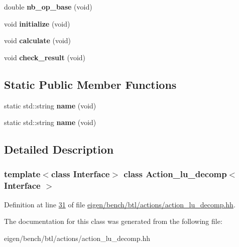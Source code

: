 \begin{DoxyCompactItemize}
\item 
\mbox{\label{class_action__lu__decomp_a381d0374009d61ad08fbb5999b2fc707}} 
double {\bfseries nb\+\_\+op\+\_\+base} (void)
\item 
\mbox{\label{class_action__lu__decomp_a065c46760336805cac70deaccfd02509}} 
void {\bfseries initialize} (void)
\item 
\mbox{\label{class_action__lu__decomp_a5169d51b797f4e14aa889ffe131e6725}} 
void {\bfseries calculate} (void)
\item 
\mbox{\label{class_action__lu__decomp_aad26b74edbf61c61acefd2d9060284a3}} 
void {\bfseries check\+\_\+result} (void)
\end{DoxyCompactItemize}
\subsection*{Static Public Member Functions}
\begin{DoxyCompactItemize}
\item 
\mbox{\label{class_action__lu__decomp_a5568b3c3145f94cdb995492960dbb63c}} 
static std\+::string {\bfseries name} (void)
\item 
\mbox{\label{class_action__lu__decomp_a5568b3c3145f94cdb995492960dbb63c}} 
static std\+::string {\bfseries name} (void)
\end{DoxyCompactItemize}


\subsection{Detailed Description}
\subsubsection*{template$<$class Interface$>$\newline
class Action\+\_\+lu\+\_\+decomp$<$ Interface $>$}



Definition at line \hyperlink{eigen_2bench_2btl_2actions_2action__lu__decomp_8hh_source_l00031}{31} of file \hyperlink{eigen_2bench_2btl_2actions_2action__lu__decomp_8hh_source}{eigen/bench/btl/actions/action\+\_\+lu\+\_\+decomp.\+hh}.



The documentation for this class was generated from the following file\+:\begin{DoxyCompactItemize}
\item 
eigen/bench/btl/actions/action\+\_\+lu\+\_\+decomp.\+hh\end{DoxyCompactItemize}
